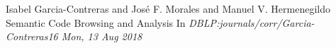 \documentclass{article}
\begin{document}
\begin{thebibliography}{1}

Isabel Garcia{-}Contreras and Jos{\'{e}} F. Morales and Manuel V. Hermenegildo
\newblock Semantic Code Browsing and Analysis
\newblock In {\em DBLP:journals/corr/Garcia-Contreras16 Mon, 13 Aug 2018}



\end{thebibliography}
%
\end{document}
